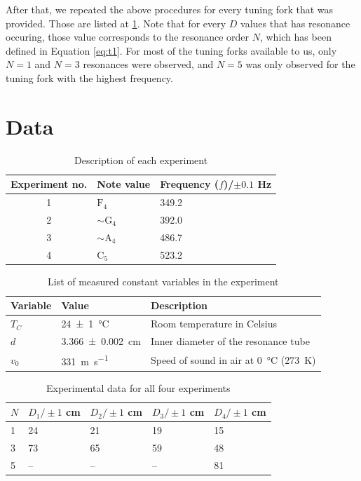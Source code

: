 \documentclass[letter]{article}
\numberwithin{equation}{section}
\numberwithin{figure}{section}
\numberwithin{table}{section}
\begin{document}
After that, we repeated the above procedures for every tuning fork that was provided. Those are listed at \ref{table:d1}. Note that for every \(D\) values that has resonance occuring, those value corresponds to the resonance order \(N\), which has been defined in Equation \eqref{eq:t1}. For most of the tuning forks available to us, only \(N = 1\) and \(N = 3\) resonances were observed, and \(N = 5\) was only observed for the tuning fork with the highest frequency.

\pagebreak
\section{Data}
\begin{table}[!h]
  \centering
  \begin{tabular}{|c|l|l|}
    \hline
    Experiment no.  & Note value            & Frequency (\(f\))/\(\pm 0.1\) \si{Hz} \\
    \hline
    1               & \(\mathrm{F}_4\)      & 349.2 \\
    2               & \(\sim \mathrm{G}_4\) & 392.0 \\
    3               & \(\sim \mathrm{A}_4\) & 486.7 \\
    4               & \(\mathrm{C}_5\)      & 523.2 \\
    \hline
  \end{tabular}
  \caption{Description of each experiment}
  \label{table:d1}
\end{table}

\begin{table}[!h]
  \centering
  \begin{tabular}{|l|l|l|}
    \hline
    Variable  & Value                       & Description\\
    \hline
    \(T_C\)   & \SI{24(1)}{\celsius}        & {Room temperature in Celsius}\\
    \(d\)     & \SI{3.366(2)}{\centi\metre} & {Inner diameter of the resonance tube}\\
    \(v_0\)   & \SI{331}{\metre\per\second} & {Speed of sound in air at \SI{0}{\celsius} (\SI{273}{\kelvin})}\\
    \hline
  \end{tabular}
  \caption{List of measured constant variables in the experiment}
  \label{table:d2}
\end{table}

\begin{table}[!h]
  \centering
  \begin{tabular}{|l|l|l|l|l|}
    \hline
    \(N\) & \(D_1 / \pm 1\) \si{cm} & \(D_2 / \pm 1\) \si{cm} & \(D_3 / \pm 1\) \si{cm} & \(D_4 / \pm 1\) \si{cm} \\
    \hline
    1  & 24  & 21  & 19  & 15 \\
    3  & 73  & 65  & 59  & 48 \\
    5  & --  & --  & --  & 81 \\
    \hline
  \end{tabular}
  \caption{Experimental data for all four experiments}
  \label{table:d3}
\end{table}
\end{document}
